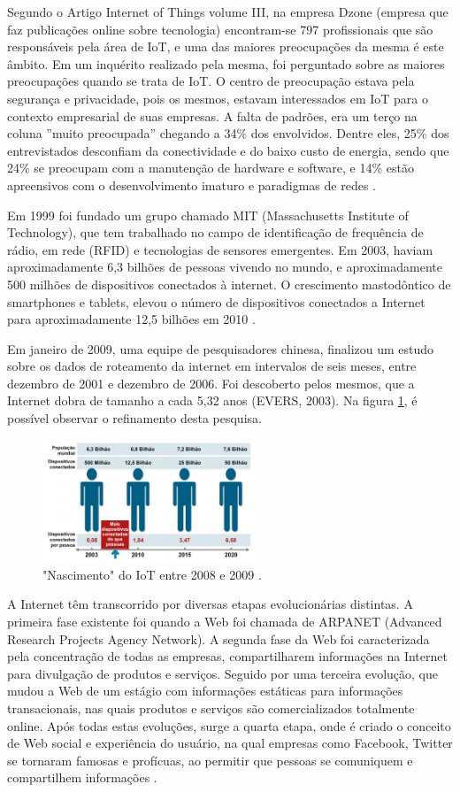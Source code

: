 \documentclass[journal]{IEEEtran}
\begin{document}
Segundo o Artigo Internet of Things volume III, na empresa Dzone (empresa que faz publicações online sobre tecnologia) encontram-se 797 profissionais que são responsáveis pela área de IoT, e uma das maiores preocupações da mesma é este âmbito. Em um inquérito realizado pela mesma, foi perguntado sobre as maiores preocupações quando se trata de IoT. O centro de preocupação estava pela segurança e privacidade, pois os mesmos, estavam interessados em IoT para o contexto empresarial de suas empresas. A falta de padrões, era um terço na coluna ''muito preocupada'' chegando a 34\% dos envolvidos. Dentre eles, 25\% dos entrevistados desconfiam da conectividade e do baixo custo de energia, sendo que 24\% se preocupam com a manutenção de hardware e software, e 14\% estão apreensivos com o desenvolvimento imaturo e paradigmas de redes \cite[p.~4]{Evans}.

Em 1999 foi fundado um grupo chamado MIT (Massachusetts Institute of Technology), que tem trabalhado no campo de identificação de frequência de rádio, em rede (RFID) e tecnologias de sensores emergentes. Em 2003, haviam aproximadamente 6,3 bilhões de pessoas vivendo no mundo, e aproximadamente 500 milhões de dispositivos conectados à internet. O crescimento mastodôntico de smartphones e tablets, elevou o número de dispositivos conectados a Internet para aproximadamente 12,5 bilhões em 2010 \cite[p.~3]{Evans}.

Em janeiro de 2009, uma equipe de pesquisadores chinesa, finalizou um estudo sobre os dados de roteamento da internet em intervalos de seis meses, entre dezembro de 2001 e dezembro de 2006. Foi descoberto pelos mesmos, que a Internet dobra de tamanho a cada 5,32 anos (EVERS, 2003). Na figura \ref{fig_um}, é possível observar o refinamento desta pesquisa.

\begin{figure}[h]
\centering
\includegraphics[width=2.5in]{um}
\caption{"Nascimento" do IoT entre 2008 e 2009 \cite{Evans}.}
\label{fig_um}
\end{figure}


A Internet têm transcorrido por diversas etapas evolucionárias distintas. A primeira fase existente foi quando a Web foi chamada de ARPANET (Advanced Research Projects Agency Network). A segunda fase da Web foi caracterizada pela concentração de todas as empresas, compartilharem informações na Internet para divulgação de produtos e serviços. Seguido por uma terceira evolução, que mudou a Web de um estágio com informações estáticas para informações transacionais, nas quais produtos e serviços são comercializados totalmente online. Após todas estas evoluções, surge a quarta etapa, onde é criado o conceito de Web social e experiência do usuário, na qual empresas como Facebook, Twitter se tornaram famosas e profícuas, ao permitir que pessoas se comuniquem e compartilhem informações \cite[p.~6]{Evans}.
\end{document}
